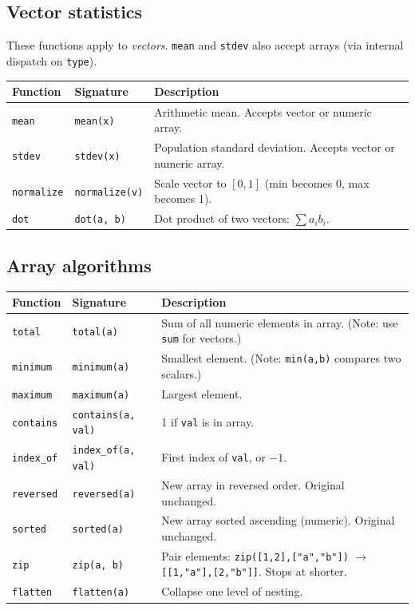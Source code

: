\documentclass[11pt,a4paper]{article}
\begin{document}
\subsection{Vector statistics}

These functions apply to \emph{vectors}. \texttt{mean} and \texttt{stdev} also
accept arrays (via internal dispatch on \texttt{type}).

\begin{longtable}{@{}L{3.5cm}L{3.8cm}L{7.2cm}@{}}
\toprule
\textbf{Function} & \textbf{Signature} & \textbf{Description} \\
\midrule
\endhead
\texttt{mean}       & \texttt{mean(x)}        & Arithmetic mean. Accepts vector or numeric array. \\
\texttt{stdev}      & \texttt{stdev(x)}       & Population standard deviation. Accepts vector or numeric array. \\
\texttt{normalize}  & \texttt{normalize(v)}   & Scale vector to $[0, 1]$ (min becomes 0, max becomes 1). \\
\texttt{dot}        & \texttt{dot(a, b)}      & Dot product of two vectors: $\sum a_i b_i$. \\
\bottomrule
\end{longtable}

\subsection{Array algorithms}

\begin{longtable}{@{}L{3.5cm}L{4cm}L{7cm}@{}}
\toprule
\textbf{Function} & \textbf{Signature} & \textbf{Description} \\
\midrule
\endhead
\texttt{total}      & \texttt{total(a)}           & Sum of all numeric elements in array. (Note: use \texttt{sum} for vectors.) \\
\texttt{minimum}    & \texttt{minimum(a)}         & Smallest element. (Note: \texttt{min(a,b)} compares two scalars.) \\
\texttt{maximum}    & \texttt{maximum(a)}         & Largest element. \\
\texttt{contains}   & \texttt{contains(a, val)}   & 1 if \texttt{val} is in array. \\
\texttt{index\_of}  & \texttt{index\_of(a, val)}  & First index of \texttt{val}, or $-1$. \\
\texttt{reversed}   & \texttt{reversed(a)}        & New array in reversed order. Original unchanged. \\
\texttt{sorted}     & \texttt{sorted(a)}          & New array sorted ascending (numeric). Original unchanged. \\
\texttt{zip}        & \texttt{zip(a, b)}          & Pair elements: \texttt{zip([1,2],["a","b"])} $\to$ \texttt{[[1,"a"],[2,"b"]]}. Stops at shorter. \\
\texttt{flatten}    & \texttt{flatten(a)}         & Collapse one level of nesting. \\
\bottomrule
\end{longtable}
\end{document}
